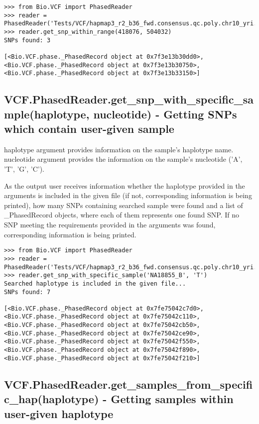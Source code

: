 \begin{verbatim}
>>> from Bio.VCF import PhasedReader
>>> reader = PhasedReader('Tests/VCF/hapmap3_r2_b36_fwd.consensus.qc.poly.chr10_yri.D.phased')
>>> reader.get_snp_within_range(418076, 504032)
SNPs found: 3

[<Bio.VCF.phase._PhasedRecord object at 0x7f3e13b30dd0>,
<Bio.VCF.phase._PhasedRecord object at 0x7f3e13b30750>,
<Bio.VCF.phase._PhasedRecord object at 0x7f3e13b33150>]

\end{verbatim}

\subsection{VCF.PhasedReader.get_snp_with_specific_sample(haplotype, nucleotide) - Getting SNPs which contain user-given sample}

\noindent haplotype argument provides information on the sample's haplotype name.
nucleotide argument provides the information on the sample's nucleotide ('A', 'T', 'G', 'C'). 

\noindent As the output user receives information whether the haplotype provided in the arguments is included in the given file (if not, corresponding information 
is being printed), how many SNPs containing searched sample were found and a list of _PhasedRecord objects, where each of them represents one found SNP. If no SNP 
meeting the requirements provided in the arguments was found, corresponding information is being printed. 

\begin{verbatim}
>>> from Bio.VCF import PhasedReader
>>> reader = PhasedReader('Tests/VCF/hapmap3_r2_b36_fwd.consensus.qc.poly.chr10_yri.D.phased')
>>> reader.get_snp_with_specific_sample('NA18855_B', 'T')
Searched haplotype is included in the given file...
SNPs found: 7

[<Bio.VCF.phase._PhasedRecord object at 0x7fe75042c7d0>, <Bio.VCF.phase._PhasedRecord object at 0x7fe75042c110>, <Bio.VCF.phase._PhasedRecord object at 0x7fe75042cb50>, <Bio.VCF.phase._PhasedRecord object at 0x7fe75042ce90>, <Bio.VCF.phase._PhasedRecord object at 0x7fe75042f550>, <Bio.VCF.phase._PhasedRecord object at 0x7fe75042f890>, <Bio.VCF.phase._PhasedRecord object at 0x7fe75042f210>]
\end{verbatim}

\subsection{VCF.PhasedReader.get_samples_from_specific_hap(haplotype) - Getting samples within user-given haplotype}


